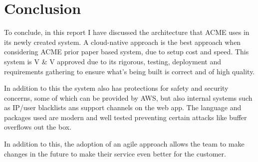 \section{Conclusion}
  To conclude, in this report I have discussed the architecture that ACME uses in its newly created system. A cloud-native approach is the best 
  approach when considering ACME prior paper based system, due to setup cost and speed. This system is V \& V approved due to its rigorous, testing,
  deployment and requirements gathering to ensure what's being built is correct and of high quality.

  In addition to this the system also has protections for safety and security concerns, some of which can be provided by AWS, but also internal systems
  such as IP/user blacklists ans support channels on the web app. The language and packages used are modern and well tested preventing certain attacks
  like buffer overflows out the box.

  In addition to this, the adoption of an agile approach allows the team to make changes in the future to make their service even better for the customer.
\newpage